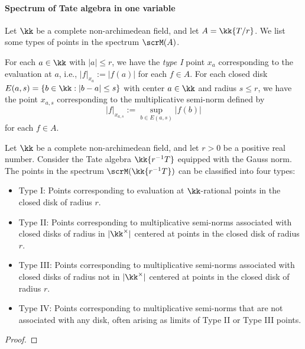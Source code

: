     \paragraph{Spectrum of Tate algebra in one variable} Let \(\kk\) be a complete non-archimedean field, and let \(A = \kk\{T/r\}\).
    We list some types of points in the spectrum \(\scrM(A)\).

    For each \(a \in \kk\) with \(|a| \leq r\), we have the \emph{type I} point \(x_a\) corresponding to the evaluation at \(a\), i.e., \(|f|_{x_a} := |f(a)|\) for each \(f \in A\).
    For each closed disk \(E(a,s) = \{b \in \kk : |b - a| \leq s\}\) with center \(a \in \kk\) and radius \(s \leq r\), we have the point \(x_{a,s}\) corresponding to the multiplicative semi-norm defined by
    \[ |f|_{x_{a,s}} := \sup_{b \in E(a,s)} |f(b)| \]
    for each \(f \in A\).


    \begin{proposition}\label{prop:four_types_of_points_in_spectrum_of_Tate_algebra_in_one_variable}
        Let \(\kk\) be a complete non-archimedean field, and let \(r > 0\) be a positive real number.
        Consider the Tate algebra \(\kk\{r^{-1}T\}\) equipped with the Gauss norm.
        The points in the spectrum \(\scrM(\kk\{r^{-1}T\})\) can be classified into four types:
        \begin{itemize}
            \item Type I: Points corresponding to evaluation at \(\kk\)-rational points in the closed disk of radius \(r\).
            \item Type II: Points corresponding to multiplicative semi-norms associated with closed disks of radius in \(|\kk^\times|\) centered at points in the closed disk of radius \(r\).
            \item Type III: Points corresponding to multiplicative semi-norms associated with closed disks of radius not in \(|\kk^\times|\) centered at points in the closed disk of radius \(r\).
            \item Type IV: Points corresponding to multiplicative semi-norms that are not associated with any disk, often arising as limits of Type II or Type III points.
        \end{itemize}
    \end{proposition}
    \begin{proof}
    \end{proof}